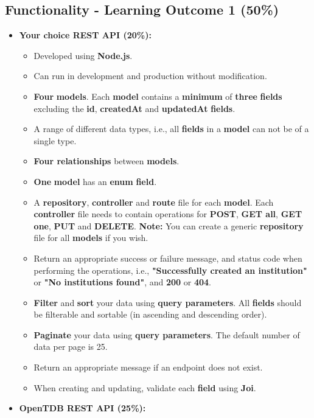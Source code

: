 \documentclass{article}
\begin{document}
\subsection*{Functionality - Learning Outcome 1 (50\%)}
\begin{itemize} 
	\item \textbf{Your choice REST API (20\%):}
	\begin{itemize}
		\item Developed using \textbf{Node.js}.
		\item Can run in development and production without modification.
		\item \textbf{Four} \textbf{models}. Each \textbf{model} contains a \textbf{minimum} of \textbf{three} \textbf{fields} excluding the \textbf{id}, \textbf{createdAt} and \textbf{updatedAt} \textbf{fields}.
		\item A range of different data types, i.e., all \textbf{fields} in a \textbf{model} can not be of a single type.
		\item \textbf{Four relationships} between \textbf{models}.
		\item \textbf{One} \textbf{model} has an \textbf{enum} \textbf{field}. 
		\item A \textbf{repository}, \textbf{controller} and \textbf{route} file for each \textbf{model}. Each \textbf{controller} file needs to contain operations for \textbf{POST}, \textbf{GET all}, \textbf{GET one}, \textbf{PUT} and \textbf{DELETE}. \textbf{Note:} You can create a generic \textbf{repository} file for all \textbf{models} if you wish.
		\item Return an appropriate success or failure message, and status code when performing the operations, i.e., \textbf{"Successfully created an institution"} or \textbf{"No institutions found"}, and \textbf{200} or \textbf{404}.
		\item \textbf{Filter} and \textbf{sort} your data using \textbf{query parameters}. All \textbf{fields} should be filterable and sortable (in ascending and descending order).
		\item \textbf{Paginate} your data using \textbf{query parameters}. The default number of data per page is 25.
		\item Return an appropriate message if an endpoint does not exist.
		\item When creating and updating, validate each \textbf{field} using \textbf{Joi}. 
	\end{itemize}
	\item \textbf{OpenTDB REST API (25\%):}

\end{itemize}
\end{document}
